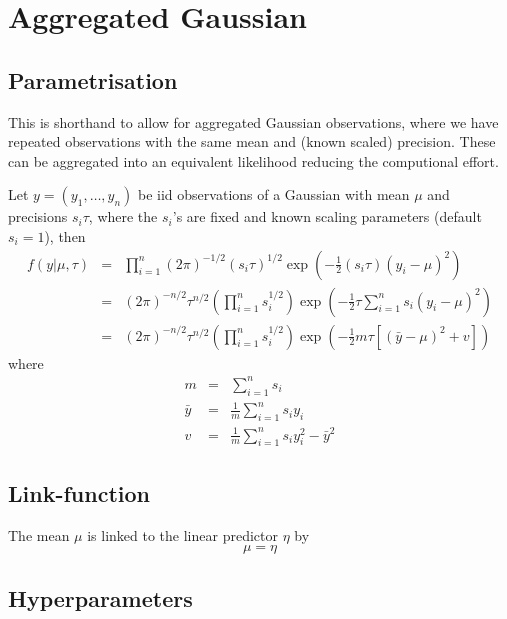 \documentclass[a4paper,11pt]{article}
\begin{document}
\section*{Aggregated Gaussian}

\subsection*{Parametrisation}

This is shorthand to allow for aggregated Gaussian observations, where
we have repeated observations with the same mean and (known scaled)
precision. These can be aggregated into an equivalent likelihood
reducing the computional effort.

Let $y=(y_1, \ldots, y_n)$ be iid observations of a Gaussian with mean
$\mu$ and precisions $s_i\tau$, where the $s_i$'s are fixed and known
scaling parameters (default $s_i=1$), then
\begin{eqnarray}
    f(y|\mu,\tau) &=& \prod_{i=1}^{n}
    (2\pi)^{-1/2}(s_i\tau)^{1/2} \exp\left( -\frac{1}{2}
                       (s_i\tau) \left(y_i-\mu\right)^{2}\right) \\
                   &=& (2\pi)^{-n/2} \tau^{n/2} \left(\prod_{i=1}^{n} s_i^{1/2}\right)
                       \exp\left(-\frac{1}{2} \tau \sum_{i=1}^{n} s_i
                       (y_i-\mu)^{2}\right)\\
                   &=& (2\pi)^{-n/2} \tau^{n/2} \left(\prod_{i=1}^{n} s_i^{1/2}\right)
                       \exp\left(-\frac{1}{2} m\tau \left[
                       (\bar{y} - \mu)^{2} + v \right]\right)
\end{eqnarray}
where
\begin{eqnarray}
  m &=& \sum_{i=1}^{n} s_i\nonumber\\
  \bar{y} &=& \frac{1}{m}\sum_{i=1}^{n} s_i y_i\nonumber\\
  v & =&  \frac{1}{m}\sum_{i=1}^{n} s_i y_i^2 -  {\bar{y}}^2 \nonumber
\end{eqnarray}

\subsection*{Link-function}

The mean $\mu$ is linked to the linear predictor $\eta$ by
\begin{displaymath}
    \mu = \eta
\end{displaymath}

\subsection*{Hyperparameters}
\end{document}
